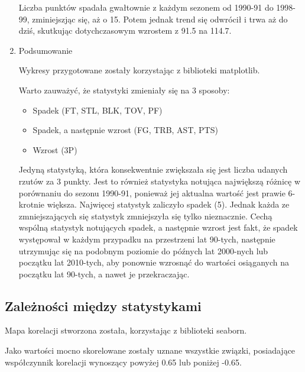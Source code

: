 \documentclass{article}
\begin{document}
\begin{enumerate}
        Liczba punktów spadała gwałtownie z każdym sezonem od 1990-91 do 1998-99, zminiejszjąc się, aż o 15. Potem jednak trend się odwrócił i trwa aż do dziś, skutkując dotychczasowym wzrostem z 91.5 na 114.7.
            
        \item Podsumowanie
        
    Wykresy przygotowane zostały korzystając z biblioteki matplotlib.
    
    Warto zauważyć, że statystyki zmieniały się na 3 sposoby:
    \begin{itemize}
        \item Spadek (FT, STL, BLK, TOV, PF)
        \item Spadek, a następnie wzrost (FG, TRB, AST, PTS)
        \item Wzrost (3P)
    \end{itemize}

    Jedyną statystyką, która konsekwentnie zwiększała się jest liczba udanych rzutów za 3 punkty. Jest to również statystyka notująca największą różnicę w porównaniu do sezonu 1990-91, ponieważ jej aktualna wartość jest prawie 6-krotnie większa. Najwięcej statystyk zaliczyło spadek (5). Jednak każda ze zmniejszających się statystyk zmniejszyła się tylko nieznacznie. Cechą wspólną statystyk notujących spadek, a następnie wzrost jest fakt, że spadek występował w każdym przypadku na przestrzeni lat 90-tych, następnie utrzymując się na podobnym poziomie do późnych lat 2000-nych lub początku lat 2010-tych, aby ponownie wzrosnąć do wartości osiąganych na początku lat 90-tych, a nawet je przekraczając.

    \end{enumerate}

    \subsection{Zależności między statystykami}

    Mapa korelacji stworzona została, korzystając z biblioteki seaborn.

    Jako wartości mocno skorelowane zostały uznane wszystkie związki, posiadające współczynnik korelacji wynoszący  powyżej 0.65 lub poniżej -0.65.
    
\end{document}
